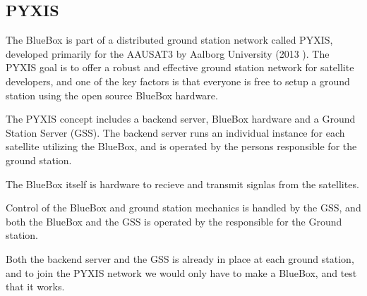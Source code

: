 \subsection{PYXIS}
The BlueBox is part of a distributed ground station network called PYXIS, developed primarily for the AAUSAT3 by Aalborg University (2013 \cite{aausat3}). The PYXIS goal is to offer a robust and effective ground station network for satellite developers, and one of the key factors is that everyone is free to setup a ground station using the open source BlueBox hardware. 

The PYXIS concept includes a backend server, BlueBox hardware and a Ground Station Server (GSS). The backend server runs an individual instance for each satellite utilizing the BlueBox, and is operated by the persons responsible for the ground station. 

The BlueBox itself is hardware to recieve and transmit signlas from the satellites.

Control of the BlueBox and ground station mechanics is handled by the GSS, and both the BlueBox and the GSS is operated by the responsible for the Ground station. 

Both the backend server and the GSS is already in place at each ground station, and to join the PYXIS network we would only have to make a BlueBox, and test that it works.

